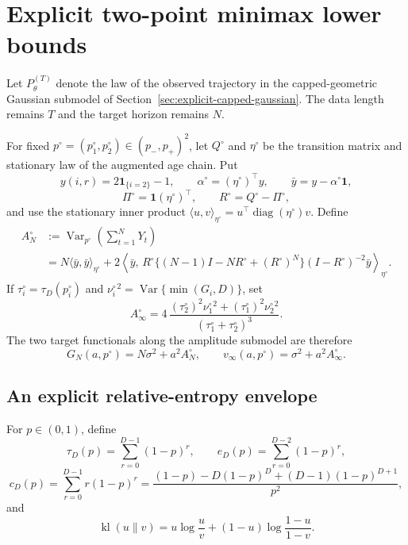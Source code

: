 \section{Explicit two-point minimax lower bounds}
\label{sec:minimax-lower-bound}

Let \(P_\theta^{(T)}\) denote the law of the observed trajectory in the
capped-geometric Gaussian submodel of
Section~\ref{sec:explicit-capped-gaussian}.  The data length remains \(T\)
and the target horizon remains \(N\).

For fixed \(p^\circ=(p_1^\circ,p_2^\circ)\in(p_-,p_+)^2\), let
\(Q^\circ\) and \(\eta^\circ\) be the transition matrix and stationary law
of the augmented age chain.  Put
\[
 y(i,r)=2\mathbf 1_{\{i=2\}}-1,\qquad
 \alpha^\circ=(\eta^\circ)^\top y,\qquad
 \bar y=y-\alpha^\circ\mathbf 1,
\]
\[
 \Pi^\circ=\mathbf 1(\eta^\circ)^\top,\qquad
 R^\circ=Q^\circ-\Pi^\circ,
\]
and use the stationary inner product
\(\langle u,v\rangle_{\eta^\circ}
=u^\top\operatorname{diag}(\eta^\circ)v\).  Define
\begin{align}
 A_N^\circ
 &:=
 \operatorname{Var}_{p^\circ}\!\left(\sum_{t=1}^N Y_t\right)
 \nonumber\\
 &=N\langle\bar y,\bar y\rangle_{\eta^\circ}
 +2\left\langle
 \bar y,\,
 R^\circ\{(N-1)I-NR^\circ+(R^\circ)^N\}
 (I-R^\circ)^{-2}\bar y
 \right\rangle_{\eta^\circ}.
 \label{eq:lb-AN}
\end{align}
If \(\tau_i^\circ=\tau_D(p_i^\circ)\) and
\(\nu_i^{\circ\,2}=\operatorname{Var}\{\min(G_i,D)\}\), set
\begin{equation}
 A_\infty^\circ
 =
 4\,
 \frac{(\tau_2^\circ)^2\nu_1^{\circ\,2}
       +(\tau_1^\circ)^2\nu_2^{\circ\,2}}
      {(\tau_1^\circ+\tau_2^\circ)^3}.
 \label{eq:lb-Ainfty}
\end{equation}
The two target functionals along the amplitude submodel are therefore
\begin{equation}
 G_N(a,p^\circ)=N\sigma^2+a^2A_N^\circ,\qquad
 v_\infty(a,p^\circ)=\sigma^2+a^2A_\infty^\circ.
 \label{eq:lb-target-amplitude}
\end{equation}

\subsection{An explicit relative-entropy envelope}

For \(p\in(0,1)\), define
\[
 \tau_D(p)=\sum_{r=0}^{D-1}(1-p)^r,\qquad
 e_D(p)=\sum_{r=0}^{D-2}(1-p)^r,
\]
\[
 c_D(p)=\sum_{r=0}^{D-1}r(1-p)^r
 =\frac{(1-p)-D(1-p)^D+(D-1)(1-p)^{D+1}}{p^2},
\]
and
\[
 \operatorname{kl}(u\|v)
 =u\log\frac uv+(1-u)\log\frac{1-u}{1-v}.
\]

